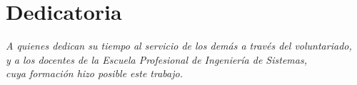 \chapter*{Dedicatoria}
\vspace*{2cm}
\begin{flushright}
\itshape
A quienes dedican su tiempo al servicio de los dem\'as a trav\'es del voluntariado, \\
y a los docentes de la Escuela Profesional de Ingenier\'ia de Sistemas, \\
cuya formaci\'on hizo posible este trabajo.
\end{flushright}
